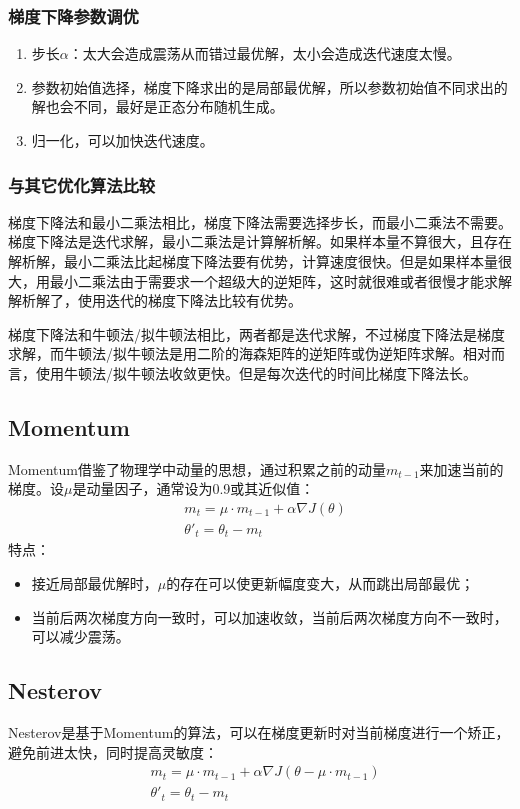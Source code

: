 \documentclass[11pt]{report}
\begin{document}
\subsubsection{梯度下降参数调优}
\begin{enumerate}
	\item 步长$\alpha$：太大会造成震荡从而错过最优解，太小会造成迭代速度太慢。
	\item 参数初始值选择，梯度下降求出的是局部最优解，所以参数初始值不同求出的解也会不同，最好是正态分布随机生成。
	\item 归一化，可以加快迭代速度。
\end{enumerate}
\subsubsection{与其它优化算法比较}
梯度下降法和最小二乘法相比，梯度下降法需要选择步长，而最小二乘法不需要。梯度下降法是迭代求解，最小二乘法是计算解析解。如果样本量不算很大，且存在解析解，最小二乘法比起梯度下降法要有优势，计算速度很快。但是如果样本量很大，用最小二乘法由于需要求一个超级大的逆矩阵，这时就很难或者很慢才能求解解析解了，使用迭代的梯度下降法比较有优势。
\par
梯度下降法和牛顿法/拟牛顿法相比，两者都是迭代求解，不过梯度下降法是梯度求解，而牛顿法/拟牛顿法是用二阶的海森矩阵的逆矩阵或伪逆矩阵求解。相对而言，使用牛顿法/拟牛顿法收敛更快。但是每次迭代的时间比梯度下降法长。
\subsection{Momentum}
Momentum借鉴了物理学中动量的思想，通过积累之前的动量$m_{t-1}$来加速当前的梯度。设$\mu$是动量因子，通常设为0.9或其近似值：
\begin{equation}
	\begin{split}
		&m_t=\mu\cdot m_{t-1}+\alpha\nabla J(\theta)\\
		&\theta'_t=\theta_t-m_t
	\end{split}
\end{equation}
特点：
\begin{itemize}
	\item 接近局部最优解时，$\mu$的存在可以使更新幅度变大，从而跳出局部最优；
	\item 当前后两次梯度方向一致时，可以加速收敛，当前后两次梯度方向不一致时，可以减少震荡。
\end{itemize}
\subsection{Nesterov}
Nesterov是基于Momentum的算法，可以在梯度更新时对当前梯度进行一个矫正，避免前进太快，同时提高灵敏度：
\begin{equation}
	\begin{split}
		&m_t=\mu\cdot m_{t-1}+\alpha\nabla J(\theta-\mu\cdot m_{t-1})\\
		&\theta'_t=\theta_t-m_t
	\end{split}
\end{equation}
\end{document}

